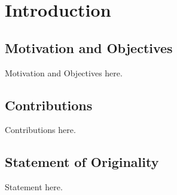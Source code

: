 
\chapter{Introduction}

\section{Motivation and Objectives}

Motivation and Objectives here.



\section{Contributions}

Contributions here.


\section{Statement of Originality}

Statement here.

